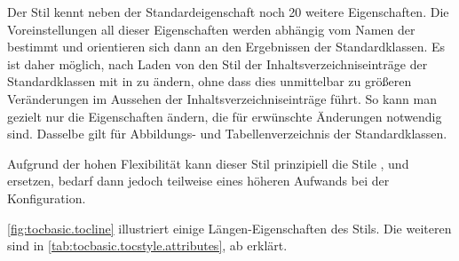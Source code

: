\begin{description}
  Der Stil kennt neben der Standardeigenschaft  noch
  20
  weitere Eigenschaften. Die Voreinstellungen all dieser Eigenschaften werden
  abhängig vom Namen der  bestimmt und orientieren sich
  dann an den Ergebnissen der Standardklassen. Es ist daher möglich, nach
  Laden von  den Stil der Inhaltsverzeichniseinträge der
  Standardklassen mit  in
   zu ändern, ohne dass dies unmittelbar zu größeren
  Veränderungen im Aussehen der Inhaltsverzeichniseinträge führt. So kann man
  gezielt nur die Eigenschaften ändern, die für erwünschte Änderungen
  notwendig sind.  Dasselbe gilt für Abbildungs- und Tabellenverzeichnis der
  Standardklassen.%

  Aufgrund der hohen Flexibilität kann dieser Stil prinzipiell die Stile
  ,  und 
  ersetzen, bedarf dann jedoch teilweise eines höheren Aufwands bei der
  Konfiguration. 

  \autoref{fig:tocbasic.tocline} illustriert einige Längen-Eigenschaften des
  Stils. Die weiteren sind in \autoref{tab:tocbasic.tocstyle.attributes}, ab
   erklärt.
  \begin{figure}
    \centering
\end{figure}
\end{description}
